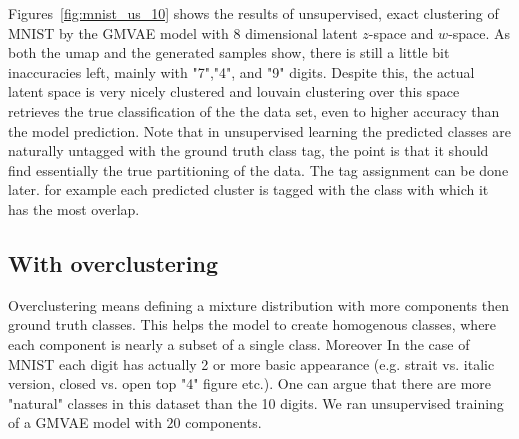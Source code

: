 \documentclass[11pt, a4paper]{report}
\theoremstyle{plain}
\theoremstyle{definition}
\theoremstyle{remark}
\begin{document}
Figures~\ref{fig:mnist_us_10} shows the results of unsupervised, exact clustering
of MNIST by the GMVAE model with 8 dimensional latent $z$-space and
$w$-space.
As both the umap and the generated samples show, there is still a little bit
inaccuracies left, mainly with "7","4", and "9" digits.
Despite this, the actual latent space is very nicely clustered and louvain
clustering over this space retrieves the true classification of the the data
set, even to higher accuracy than the model prediction.
Note that in unsupervised learning the predicted classes are naturally untagged
with the ground truth class tag, the point is that it should find essentially
the true partitioning of the data. The tag assignment can be done later. for
example each predicted cluster is tagged with the class with which it has the
most overlap.

\subsection{With overclustering}
Overclustering means defining a mixture distribution with more components then
ground truth classes. This helps the model to create homogenous classes,
where each component is nearly a subset of a single class.
Moreover In the case of MNIST each digit has actually 2 or more basic appearance (e.g. 
strait vs. italic version, closed vs. open top "4" figure etc.). One can argue
that there are more "natural" classes in this dataset than the 10 digits.
We ran unsupervised training of a GMVAE model with $20$ components.
\end{document}
